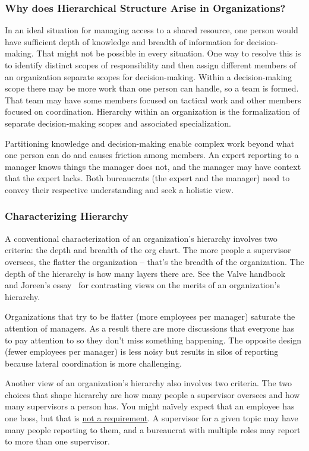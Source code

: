 \subsubsection*{Why does Hierarchical Structure Arise in Organizations?}

In an ideal situation for managing access to a shared resource, one person would have sufficient depth of knowledge and breadth of information for decision-making. That might not be possible in every situation. One way to resolve this is to identify distinct scopes of responsibility and then assign different members of an organization separate scopes for decision-making. Within a decision-making scope there may be more work than one person can handle, so a team is formed. That team may have some members focused on tactical work and other members focused on coordination. Hierarchy within an organization is the formalization of separate decision-making scopes and associated specialization. 

Partitioning knowledge and decision-making enable complex work beyond what one person can do and causes friction among members. An expert reporting to a manager knows things the manager does not, and the manager may have context that the expert lacks. Both bureaucrats (the expert and the manager) need to convey their respective understanding and seek a holistic view.

\subsubsection*{Characterizing Hierarchy}

A conventional characterization of an organization's hierarchy involves two criteria: the depth and breadth of the \gls{org chart}.
The more people a supervisor oversees, the flatter the organization -- that's the breadth of the organization. The depth of the hierarchy is how many layers there are. See the Valve handbook~\cite{2012_Valve} and Joreen's essay~\cite{1972_Joreen} for contrasting views on the merits of an organization's hierarchy. 

Organizations that try to be flatter (more employees per manager) saturate the attention of managers. As a result there are more discussions that everyone has to pay attention to so they don't miss something happening. The opposite design (fewer employees per manager) is less noisy but results in silos of reporting because lateral coordination is more challenging.

Another view of an organization's hierarchy also involves two criteria. The two choices that shape hierarchy are how many people a supervisor oversees and  how many supervisors a person has. 
You might na\"ively expect that an employee has one boss, but that is \href{https://en.wikipedia.org/wiki/Matrix_management}{not a requirement}.%
\iftoggle{WPinmargin}{\marginpar{$>$Wikipedia: Matrix management}}{}
A supervisor for a given topic may have many people reporting to them, and a bureaucrat with multiple roles may report to more than one supervisor.

